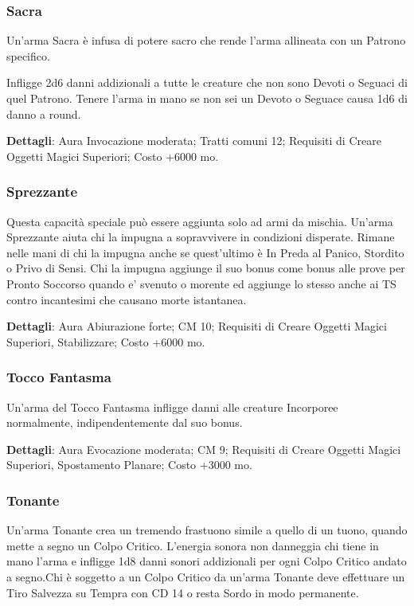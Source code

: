 \begin{multicols}{2}
\subsubsection{Sacra}

Un'arma Sacra è infusa di potere sacro che rende l'arma allineata con un Patrono specifico. 

Infligge 2d6 danni addizionali a tutte le creature che non sono Devoti o Seguaci di quel Patrono. Tenere l'arma in mano se non sei un Devoto o Seguace causa 1d6 di danno a round.

\textbf{Dettagli}: Aura Invocazione moderata; Tratti comuni 12; Requisiti di Creare Oggetti Magici Superiori; Costo +6000 mo.


\subsubsection{Sprezzante}

Questa capacità speciale può essere aggiunta solo ad armi da mischia. Un'arma Sprezzante aiuta chi la impugna a sopravvivere in condizioni disperate. Rimane nelle mani di chi la impugna anche se quest'ultimo è In Preda al Panico, Stordito o Privo di Sensi. Chi la impugna aggiunge il suo bonus come bonus alle prove per Pronto Soccorso quando e' svenuto  o morente ed aggiunge lo stesso anche ai TS contro incantesimi che causano morte istantanea.

\textbf{Dettagli}: Aura Abiurazione forte; CM 10; Requisiti di Creare Oggetti Magici Superiori, Stabilizzare; Costo +6000 mo.

\subsubsection{Tocco Fantasma}

Un'arma del Tocco Fantasma infligge danni alle creature Incorporee normalmente, indipendentemente dal suo bonus. 

\textbf{Dettagli}: Aura Evocazione moderata; CM 9; Requisiti di Creare Oggetti Magici Superiori, Spostamento Planare; Costo +3000 mo.

\subsubsection{Tonante}

Un'arma Tonante crea un tremendo frastuono simile a quello di un tuono, quando mette a segno un Colpo Critico. L'energia sonora non danneggia chi tiene in mano l'arma e infligge 1d8 danni sonori addizionali per ogni Colpo Critico andato a segno.Chi è soggetto a un Colpo Critico da un'arma Tonante deve effettuare un Tiro Salvezza su Tempra con CD 14 o resta Sordo in modo permanente.


\end{multicols}
